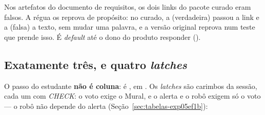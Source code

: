 \begin{nota}
Nos artefatos do documento de requisitos, os dois links do pacote curado eram
falsos. A régua os reprova de propósito: no curado, a  (verdadeira)
passou a link e a  (falsa) a texto, sem mudar uma palavra, e a versão
original reprova num teste que prende isso. É \emph{default} até o dono do
produto responder ().
\end{nota}

\subsection{Exatamente três, e quatro \emph{latches}}

O passo do estudante \textbf{não é coluna}: é ,
em . Os \emph{latches} são carimbos da sessão, cada um com
\emph{CHECK}: o voto exige o Mural, e o alerta e o robô exigem só o voto ---
o robô não depende do alerta (Seção~\ref{sec:tabelas-exp05ef1b}):

